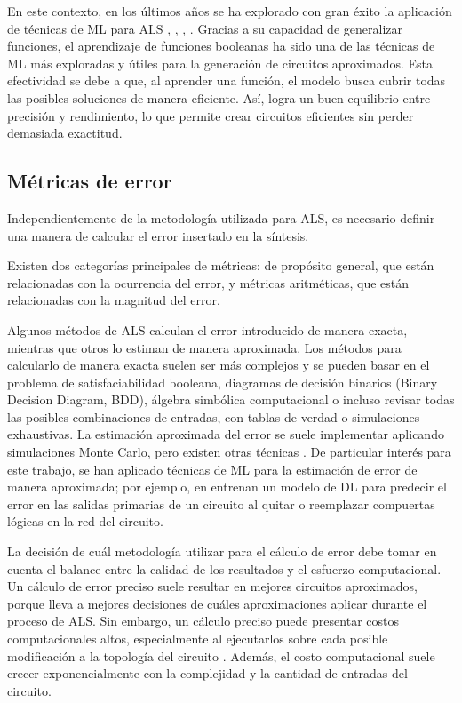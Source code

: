 En este contexto, en los últimos años se ha explorado con gran éxito la
aplicación de técnicas de ML para ALS \cite{pasandi_approximate_2019},
\cite{rai_logic_2021}, \cite{berndt_review_2022},
\cite{prats_ramos_impact_2024}. Gracias a su capacidad de generalizar
funciones, el aprendizaje de funciones booleanas ha sido una de las técnicas de
ML más exploradas y útiles para la generación de circuitos aproximados. Esta
efectividad se debe a que, al aprender una función, el modelo busca cubrir
todas las posibles soluciones de manera eficiente. Así, logra un buen
equilibrio entre precisión y rendimiento, lo que permite crear circuitos
eficientes sin perder demasiada exactitud.

\subsection{Métricas de error}

Independientemente de la metodología utilizada para ALS, es necesario definir
una manera de calcular el error insertado en la síntesis.

Existen dos categorías principales de métricas: de propósito general, que están
relacionadas con la ocurrencia del error, y métricas aritméticas, que están
relacionadas con la magnitud del error.

Algunos métodos de ALS calculan el error introducido de manera exacta, mientras
que otros lo estiman de manera aproximada. Los métodos para calcularlo de
manera exacta suelen ser más complejos y se pueden basar en el problema de
satisfaciabilidad booleana, diagramas de decisión binarios (Binary Decision
Diagram, BDD), álgebra simbólica computacional o incluso revisar todas las
posibles combinaciones de entradas, con tablas de verdad o simulaciones
exhaustivas. La estimación aproximada del error se suele implementar aplicando
simulaciones Monte Carlo, pero existen otras técnicas
\cite{ammes_two-level_2022}. De particular interés para este trabajo, se han
aplicado técnicas de ML para la estimación de error de manera aproximada; por
ejemplo, en \cite{pasandi_deep-powerx_2020} entrenan un modelo de DL para
predecir el error en las salidas primarias de un circuito al quitar o
reemplazar compuertas lógicas en la red del circuito.

La decisión de cuál metodología utilizar para el cálculo de error debe tomar en
cuenta el balance entre la calidad de los resultados y el esfuerzo
computacional. Un cálculo de error preciso suele resultar en mejores circuitos
aproximados, porque lleva a mejores decisiones de cuáles aproximaciones aplicar
durante el proceso de ALS. Sin embargo, un cálculo preciso puede presentar
costos computacionales altos, especialmente al ejecutarlos sobre cada posible
modificación a la topología del circuito \cite{ammes_two-level_2022}. Además,
el costo computacional suele crecer exponencialmente con la complejidad y la
cantidad de entradas del circuito.

